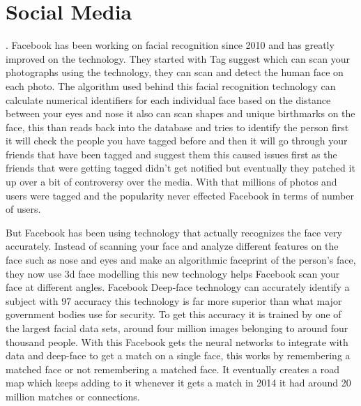 \documentclass[journal]{IEEEtran}
\begin{document}
\section{Social Media}.\newline
Facebook has been working on facial recognition since 2010 and has greatly improved on the technology. They started with Tag suggest which can scan your photographs using the technology,  they can scan and detect the human face on each photo. The algorithm used behind this facial recognition technology can calculate numerical identifiers for each individual face based on the distance between your eyes and nose it also can scan shapes and unique birthmarks on the face, this than reads back into the database and tries to identify the person first it will check the people you have tagged before and then it will go through your friends that have been tagged and suggest them this caused issues first as the friends that were getting tagged didn't get notified but eventually they patched it up over a bit of controversy over the media\cite{9503739920140321}. With that millions of photos and users were tagged and the popularity never effected Facebook in terms of number of users. 

But Facebook has been using  technology that actually recognizes the face very accurately. Instead of scanning your face and analyze different features on the face such as nose and eyes and make an algorithmic faceprint of the person's face, they now use 3d face modelling this new technology helps Facebook scan your face at different angles. Facebook Deep-face technology can accurately  identify a subject with 97 accuracy this technology is far more superior than what major government bodies use for security.  To get this accuracy it is trained by one of the largest facial data sets, around four million images belonging to around four thousand people. With this Facebook gets the neural networks to integrate with data and deep-face to get a match on a single face, this works by remembering a matched face or not remembering a matched face. It eventually creates a road map which keeps adding to it whenever it gets a match in 2014 it had around 20 million matches or connections\cite{DeepFace}.
\end{document}
